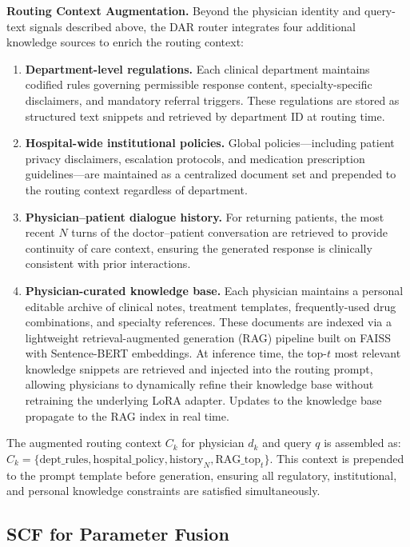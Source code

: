 \textbf{Routing Context Augmentation.} Beyond the physician identity and query-text signals described above, the DAR router integrates four additional knowledge sources to enrich the routing context:
\begin{enumerate}
\item \textbf{Department-level regulations.} Each clinical department maintains codified rules governing permissible response content, specialty-specific disclaimers, and mandatory referral triggers. These regulations are stored as structured text snippets and retrieved by department ID at routing time.
\item \textbf{Hospital-wide institutional policies.} Global policies---including patient privacy disclaimers, escalation protocols, and medication prescription guidelines---are maintained as a centralized document set and prepended to the routing context regardless of department.
\item \textbf{Physician--patient dialogue history.} For returning patients, the most recent $N$ turns of the doctor--patient conversation are retrieved to provide continuity of care context, ensuring the generated response is clinically consistent with prior interactions.
\item \textbf{Physician-curated knowledge base.} Each physician maintains a personal editable archive of clinical notes, treatment templates, frequently-used drug combinations, and specialty references. These documents are indexed via a lightweight retrieval-augmented generation (RAG) pipeline built on FAISS~\cite{johnson2019faiss} with Sentence-BERT embeddings. At inference time, the top-$t$ most relevant knowledge snippets are retrieved and injected into the routing prompt, allowing physicians to dynamically refine their knowledge base without retraining the underlying LoRA adapter. Updates to the knowledge base propagate to the RAG index in real time.
\end{enumerate}
The augmented routing context $C_k$ for physician $d_k$ and query $q$ is assembled as: $C_k = \{ \text{dept\_rules}, \text{hospital\_policy}, \text{history}_{N}, \text{RAG\_top}_{t} \}$. This context is prepended to the prompt template before generation, ensuring all regulatory, institutional, and personal knowledge constraints are satisfied simultaneously.

\subsection*{SCF for Parameter Fusion}


